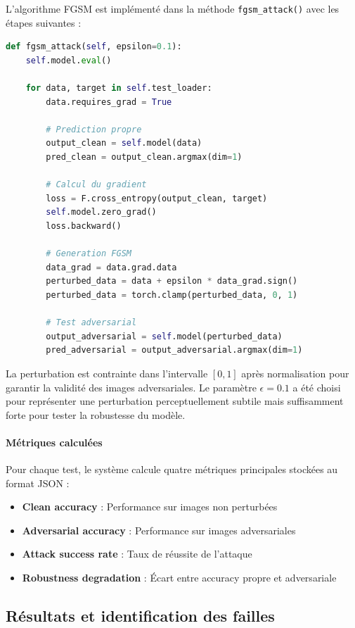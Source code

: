 L'algorithme FGSM est implémenté dans la méthode \texttt{fgsm\_attack()} avec les étapes suivantes :

\begin{lstlisting}[language=Python, caption=Génération d'exemples adverses FGSM]
def fgsm_attack(self, epsilon=0.1):
    self.model.eval()

    for data, target in self.test_loader:
        data.requires_grad = True

        # Prediction propre
        output_clean = self.model(data)
        pred_clean = output_clean.argmax(dim=1)

        # Calcul du gradient
        loss = F.cross_entropy(output_clean, target)
        self.model.zero_grad()
        loss.backward()

        # Generation FGSM
        data_grad = data.grad.data
        perturbed_data = data + epsilon * data_grad.sign()
        perturbed_data = torch.clamp(perturbed_data, 0, 1)

        # Test adversarial
        output_adversarial = self.model(perturbed_data)
        pred_adversarial = output_adversarial.argmax(dim=1)
\end{lstlisting}

La perturbation est contrainte dans l'intervalle $[0,1]$ après normalisation pour garantir la validité des images adversariales. Le paramètre $\epsilon = 0.1$ a été choisi pour représenter une perturbation perceptuellement subtile mais suffisamment forte pour tester la robustesse du modèle.

\paragraph{Métriques calculées}

Pour chaque test, le système calcule quatre métriques principales stockées au format JSON :

\begin{itemize}
    \item \textbf{Clean accuracy} : Performance sur images non perturbées
    \item \textbf{Adversarial accuracy} : Performance sur images adversariales
    \item \textbf{Attack success rate} : Taux de réussite de l'attaque
    \item \textbf{Robustness degradation} : Écart entre accuracy propre et adversariale
\end{itemize}


\subsection{Résultats et identification des failles}

